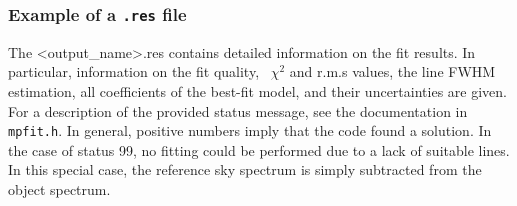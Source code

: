 \subsubsection{Example of a {\tt .res} file}\label{sec:resfile}
The <{\sc output\_name}>.res contains detailed information on the fit results.
In particular, information on the fit quality, \ie\ $\chi^2$ and r.m.s values,
the line FWHM estimation, all coefficients of the best-fit model, and their
uncertainties are given. For a description of the provided status message, see
the documentation in {\tt mpfit.h}. In general, positive numbers imply that the
code found a solution. In the case of status 99, no fitting could be performed
due to a lack of suitable lines. In this special case, the reference sky
spectrum is simply subtracted from the object spectrum.

